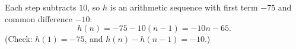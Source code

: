 Each step subtracts $10$, so $h$ is an arithmetic sequence with first term $-75$ and common difference $-10$:
\[
h(n)=-75-10(n-1)=\boxed{-10n-65}.
\]
(Check: $h(1)=-75$, and $h(n)-h(n-1)=-10$.)
